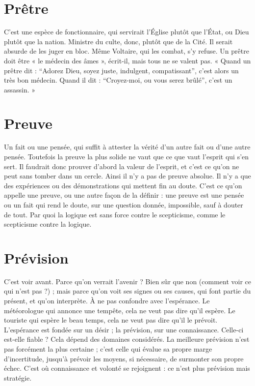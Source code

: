 \section{Prêtre}
C'est une espèce de fonctionnaire, qui servirait l’Église plutôt que
l'État, ou Dieu plutôt que la nation. Ministre du culte, donc,
plutôt que de la Cité. Il serait absurde de les juger en bloc. Même Voltaire, qui
les combat, s’y refuse. Un prêtre doit être « le médecin des âmes », écrit-il, mais
tous ne se valent pas. « Quand un prêtre dit : “Adorez Dieu, soyez juste, indulgent,
compatissant”, c’est alors un très bon médecin. Quand il dit : “Croyez-moi,
ou vous serez brûlé”, c’est un assassin. »

\section{Preuve}
Un fait ou une pensée, qui suffit à attester la vérité d’un autre fait
ou d’une autre pensée. Toutefois la preuve la plus solide ne vaut
que ce que vaut l’esprit qui s’en sert. Il faudrait donc prouver d’abord la valeur
de l'esprit, et c’est ce qu’on ne peut sans tomber dans un cercle. Ainsi il n’y a
pas de preuve absolue. Il n’y a que des expériences ou des démonstrations qui
mettent fin au doute. C’est ce qu’on appelle une preuve, ou une autre façon de
la définir : une preuve est une pensée ou un fait qui rend le doute, sur une
question donnée, impossible, sauf à douter de tout. Par quoi la logique est sans
force contre le scepticisme, comme le scepticisme contre la logique.

\section{Prévision}
C’est voir avant. Parce qu’on verrait l'avenir ? Bien sûr que non
(comment voir ce qui n’est pas ?) ; mais parce qu'on voit ses
signes ou ses causes, qui font partie du présent, et qu’on interprète. À ne pas
confondre avec l’espérance. Le météorologue qui annonce une tempête, cela ne
veut pas dire qu’il espère. Le touriste qui espère le beau temps, cela ne veut pas
dire qu’il le prévoit. L’espérance est fondée sur un désir ; la prévision, sur une
connaissance. Celle-ci est-elle fiable ? Cela dépend des domaines considérés. La
meilleure prévision n’est pas forcément la plus certaine ; c’est celle qui évalue sa
propre marge d'incertitude, jusqu’à prévoir les moyens, si nécessaire, de surmonter
son propre échec. C’est où connaissance et volonté se rejoignent : ce
n’est plus prévision mais stratégie.

